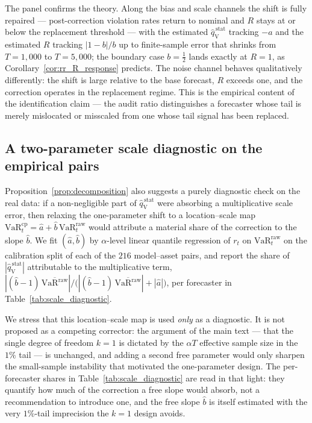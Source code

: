 \documentclass[11pt]{article}
\newcommand{\VaR}{\mathrm{VaR}}
\newcommand{\1}{\boldsymbol{1}}
\newcommand{\qVstat}{\hat{q}_{\scriptscriptstyle\mathrm{V}}^{\,\mathrm{stat}}}
\begin{document}
The panel confirms the theory. Along the bias and scale channels the shift is
fully repaired --- post-correction violation rates return to nominal and $R$
stays at or below the replacement threshold --- with the estimated $\qVstat$
tracking $-a$ and the estimated $R$ tracking $|1-b|/b$ up to finite-sample error
that shrinks from $T=1{,}000$ to $T=5{,}000$; the boundary case $b=\tfrac12$
lands exactly at $R=1$, as Corollary~\ref{cor:rr_R_response} predicts. The noise channel behaves qualitatively
differently: the shift is large relative to the base forecast, $R$ exceeds one,
and the correction operates in the replacement regime. This is the empirical
content of the identification claim --- the audit ratio distinguishes a
forecaster whose tail is merely mislocated or misscaled from one whose tail
signal has been replaced.

\subsection{A two-parameter scale diagnostic on the empirical pairs}
\label{sec:rr_ident_emp}

Proposition~\ref{prop:decomposition} also suggests a purely diagnostic check on
the real data: if a non-negligible part of $\qVstat$ were absorbing a
multiplicative scale error, then relaxing the one-parameter shift to a
location--scale map $\VaR_t^{\mathrm{cp}}=\hat a+\hat b\,\VaR_t^{\mathrm{raw}}$
would attribute a material share of the correction to the slope $\hat b$. We fit
$(\hat a,\hat b)$ by $\alpha$-level linear quantile regression of $r_t$ on
$\VaR_t^{\mathrm{raw}}$ on the calibration split of each of the $216$
model--asset pairs, and report the share of $|\qVstat|$ attributable to the
multiplicative term, $|(\hat b-1)\,\overline{\VaR^{\mathrm{raw}}}|
\big/\big(|(\hat b-1)\,\overline{\VaR^{\mathrm{raw}}}|+|\hat a|\big)$, per
forecaster in Table~\ref{tab:scale_diagnostic}.

We stress that this location--scale map is used \emph{only} as a diagnostic. It
is not proposed as a competing corrector: the argument of the main text --- that
the single degree of freedom $k=1$ is dictated by the $\alpha T$ effective
sample size in the $1\%$ tail --- is unchanged, and adding a second free
parameter would only sharpen the small-sample instability that motivated the
one-parameter design. The per-forecaster shares in
Table~\ref{tab:scale_diagnostic} are read in that light: they quantify how much
of the correction a free slope would absorb, not a recommendation to introduce
one, and the free slope $\hat b$ is itself estimated with the very
$1\%$-tail imprecision the $k=1$ design avoids.
\end{document}
